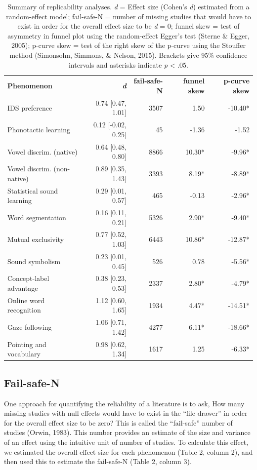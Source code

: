 \documentclass[english,floatsintext,man]{apa6}
\theoremstyle{definition}
\theoremstyle{definition}
\theoremstyle{remark}
\begin{document}
\begin{table}[t]
\footnotesize
\begin{tabular}{lrrrr}
\toprule
\textbf{Phenomenon} & \textbf{\textit{d}} & \textbf{fail-safe-N} & \textbf{funnel skew} & \textbf{p-curve skew}\\
IDS preference & 0.74 [0.47, 1.01] & 3507 & 1.50 & -10.40*\\
Phonotactic learning & 0.12 [-0.02, 0.25] & 45 & -1.36 & -1.52\\
Vowel discrim. (native) & 0.64 [0.48, 0.80] & 8866 & 10.30* & -9.96*\\
Vowel discrim. (non-native) & 0.89 [0.35, 1.43] & 3393 & 8.19* & -8.89*\\
Statistical sound learning & 0.29 [0.01, 0.57] & 465 & -0.13 & -2.96*\\
Word segmentation & 0.16 [0.11, 0.21] & 5326 & 2.90* & -9.40*\\
Mutual exclusivity & 0.77 [0.52, 1.03] & 6443 & 10.86* & -12.87*\\
Sound symbolism & 0.23 [0.01, 0.45] & 526 & 0.78 & -5.56*\\
Concept-label advantage & 0.38 [0.23, 0.53] & 2337 & 2.80* & -4.79*\\
Online word recognition & 1.12 [0.60, 1.65] & 1934 & 4.47* & -14.51*\\
Gaze following & 1.06 [0.71, 1.42] & 4277 & 6.11* & -18.66*\\
Pointing and vocabulary & 0.98 [0.62, 1.34] & 1617 & 1.25 & -6.33*\\
\bottomrule
\end{tabular}
\caption{Summary of replicability analyses. \textit{d} = Effect size (Cohen's {\it d}) estimated from a random-effect model; fail-safe-N = number of missing studies that would have to exist in order for the overall effect size to be {\it d} = 0; funnel skew = test of asymmetry in funnel plot using the random-effect Egger's test (Sterne \& Egger, 2005); p-curve skew = test of the right skew of the p-curve using the Stouffer method (Simonsohn, Simmons, \& Nelson, 2015). Brackets give 95\% confidence intervals and asterisks indicate {\it p} < .05.}
\end{table}

\subsection{Fail-safe-N}\label{fail-safe-n}

One approach for quantifying the reliability of a literature is to ask,
How many missing studies with null effects would have to exist in the
\enquote{file drawer} in order for the overall effect size to be zero?
This is called the \enquote{fail-safe} number of studies (Orwin, 1983).
This number provides an estimate of the size and variance of an effect
using the intuitive unit of number of studies. To calculate this effect,
we estimated the overall effect size for each phenomenon (Table 2,
column 2), and then used this to estimate the fail-safe-N (Table 2,
column 3).
\end{document}
